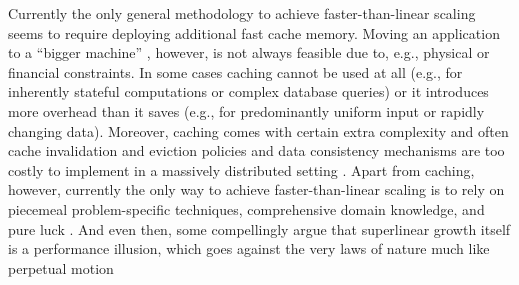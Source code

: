 Currently the only general methodology to achieve faster-than-linear scaling seems to require deploying additional fast cache memory. Moving an application to a ``bigger machine'' \cite{dobb-2}, however, is not always feasible due to, e.g., physical or financial constraints.  In some cases caching cannot be used at all (e.g., for inherently stateful computations or complex database queries) or it introduces more overhead than it saves (e.g., for predominantly uniform input or rapidly changing data).  Moreover, caching comes with certain extra complexity and often cache invalidation and eviction policies and data consistency mechanisms are too costly to implement in a massively distributed setting \cite{271208}. Apart from caching, however, currently the only way to achieve faster-than-linear scaling is to rely on piecemeal problem-specific techniques, comprehensive domain knowledge, and pure luck \cite{7733347, 80148}. And even then, some compellingly argue that superlinear growth itself is a performance illusion, which goes against the very laws of nature much like perpetual motion \cite{gunther-hotsos, 10.1145/2773212.2789974}



